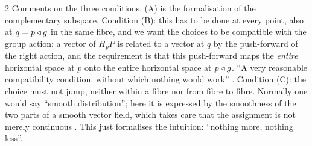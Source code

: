 \begin{paracol}{2}
Comments on the three conditions. (A) is the formalisation of the complementary subspace. Condition (B): this has to be done at every point, also at $q=p\mathbin{\triangleleft} g$ in the same fibre, and we want the choices to be compatible with the group action: a vector of $H_pP$ is related to a vector at $q$ by the push-forward of the right action, and the requirement is that this push-forward maps the \emph{entire} horizontal space at $p$ onto the entire horizontal space at $p\mathbin{\triangleleft} g$. ``A very reasonable compatibility condition, without which nothing would work''         . Condition (C): the choice must not jump, neither within a fibre nor from fibre to fibre. Normally one would say ``smooth distribution''; here it is expressed by the smoothness of the two parts of a smooth vector field, which takes care that the assignment is not merely continuous        . This just formalises the intuition: ``nothing more, nothing less''.


\end{paracol}
